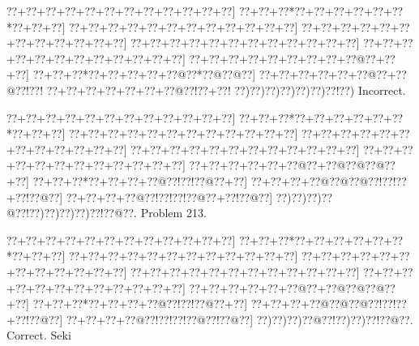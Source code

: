 \documentclass[a5paper]{article}
\begin{document}
\begin{center}
{\goo
\0??+\0??+\0??+\0??+\0??+\0??+\0??+\0??+\0??+\0??+\0??+\0??]
\0??+\0??+\0??*\0??+\0??+\0??+\0??+\0??+\0??*\0??+\0??+\0??]
\0??+\0??+\0??+\0??+\0??+\0??+\0??+\0??+\0??+\0??+\0??+\0??]
\0??+\0??+\0??+\0??+\0??+\0??+\0??+\0??+\0??+\0??+\0??+\0??]
\0??+\0??+\0??+\0??+\0??+\0??+\0??+\0??+\0??+\0??+\0??+\0??]
\0??+\0??+\0??+\0??+\0??+\0??+\0??+\0??+\0??+\0??+\0??+\0??]
\0??+\0??+\0??+\0??+\0??+\0??+\0??+\0??+\0??@\0??+\0??+\0??]
\0??+\0??+\0??*\0??+\0??+\0??+\0??+\0??@\0??*\0??@\0??@\0??]
\0??+\0??+\0??+\0??+\0??+\0??@\0??+\0??@\0??!\0??!
\0??+\0??+\0??+\0??+\0??+\0??+\0??@\0??!\0??+\0??!
\0??)\0??)\0??)\0??)\0??)\0??)\0??!\0??)
}
Incorrect. 

\end{center}
\newpage
\begin{center}
{\goo
\0??+\0??+\0??+\0??+\0??+\0??+\0??+\0??+\0??+\0??+\0??+\0??]
\0??+\0??+\0??*\0??+\0??+\0??+\0??+\0??+\0??*\0??+\0??+\0??]
\0??+\0??+\0??+\0??+\0??+\0??+\0??+\0??+\0??+\0??+\0??+\0??]
\0??+\0??+\0??+\0??+\0??+\0??+\0??+\0??+\0??+\0??+\0??+\0??]
\0??+\0??+\0??+\0??+\0??+\0??+\0??+\0??+\0??+\0??+\0??+\0??]
\0??+\0??+\0??+\0??+\0??+\0??+\0??+\0??+\0??+\0??+\0??+\0??]
\0??+\0??+\0??+\0??+\0??+\0??@\0??+\0??@\0??@\0??@\0??+\0??]
\0??+\0??+\0??*\0??+\0??+\0??+\0??@\0??!\0??!\0??@\0??+\0??]
\0??+\0??+\0??+\0??@\0??@\0??@\0??!\0??!\0??+\0??!\0??@\0??]
\0??+\0??+\0??+\0??@\0??!\0??!\0??!\0??@\0??+\0??!\0??@\0??]
\0??)\0??)\0??)\0??@\0??!\0??)\0??)\0??)\0??)\0??!\0??@\0??.
}
Problem 213.

\end{center}
\begin{center}
{\goo
\0??+\0??+\0??+\0??+\0??+\0??+\0??+\0??+\0??+\0??+\0??+\0??]
\0??+\0??+\0??*\0??+\0??+\0??+\0??+\0??+\0??*\0??+\0??+\0??]
\0??+\0??+\0??+\0??+\0??+\0??+\0??+\0??+\0??+\0??+\0??+\0??]
\0??+\0??+\0??+\0??+\0??+\0??+\0??+\0??+\0??+\0??+\0??+\0??]
\0??+\0??+\0??+\0??+\0??+\0??+\0??+\0??+\0??+\0??+\0??+\0??]
\0??+\0??+\0??+\0??+\0??+\0??+\0??+\0??+\0??+\0??+\0??+\0??]
\0??+\0??+\0??+\0??+\0??+\0??@\0??+\0??@\0??@\0??@\0??+\0??]
\0??+\0??+\0??*\0??+\0??+\0??+\0??@\0??!\0??!\0??@\0??+\0??]
\0??+\0??+\0??+\0??@\0??@\0??@\0??!\0??!\0??+\0??!\0??@\0??]
\0??+\0??+\0??+\0??@\0??!\0??!\0??!\0??@\0??!\0??@\0??]
\0??)\0??)\0??)\0??@\0??!\0??)\0??)\0??!\0??@\0??.
}
Correct. Seki

\end{center}
\end{document}
